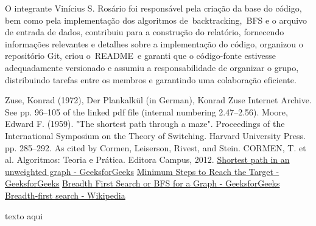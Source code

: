 \documentclass[relatorio]{IEEEtran}
\begin{document}
O integrante Vinícius S. Rosário foi responsável pela criação da base do código, bem como pela implementação dos algoritmos de backtracking, BFS e o arquivo de entrada de dados, contribuiu para a construção do relatório, fornecendo informações relevantes e detalhes sobre a implementação do código, organizou o repositório Git, criou o README e garanti que o código-fonte estivesse adequadamente versionado e assumiu a responsabilidade de organizar o grupo, distribuindo tarefas entre os membros e garantindo uma colaboração eficiente.

\renewcommand{\refname}{Referências}
\begin{thebibliography}{00}
 Zuse, Konrad (1972), Der Plankalkül (in German), Konrad Zuse Internet Archive. See pp. 96–105 of the linked pdf file (internal numbering 2.47–2.56).
 Moore, Edward F. (1959). "The shortest path through a maze". Proceedings of the International Symposium on the Theory of Switching. Harvard University Press. pp. 285–292. As cited by Cormen, Leiserson, Rivest, and Stein.
 CORMEN, T. et al. Algoritmos: Teoria e Prática. Editora Campus, 2012.
 \href{https://www.geeksforgeeks.org/shortest-path-unweighted-graph/}{Shortest path in an unweighted graph - GeeksforGeeks}
 \href{https://www.geeksforgeeks.org/minimum-steps-to-reach-the-target/}{Minimum Steps to Reach the Target - GeeksforGeeks}
 \href{https://www.geeksforgeeks.org/breadth-first-search-or-bfs-for-a-graph/}{Breadth First Search or BFS for a Graph - GeeksforGeeks}
 \href{https://en.wikipedia.org/wiki/Breadth-first_search}{Breadth-first search - Wikipedia}
\end{thebibliography}
\vspace{12pt}
\color{red}
texto aqui
\end{document}
